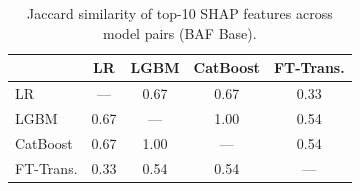\begin{table}[H]
\centering
\caption{Jaccard similarity of top-10 SHAP features across model pairs (BAF Base).}
\label{tab:shap_consistency}
\begin{tabular}{l c c c c}
\toprule
          & LR & LGBM & CatBoost & FT-Trans. \\
\midrule
LR         & --- & 0.67 & 0.67 & 0.33 \\
LGBM       & 0.67 & --- & 1.00 & 0.54 \\
CatBoost   & 0.67 & 1.00 & --- & 0.54 \\
FT-Trans.  & 0.33 & 0.54 & 0.54 & --- \\
\bottomrule
\end{tabular}
\end{table}